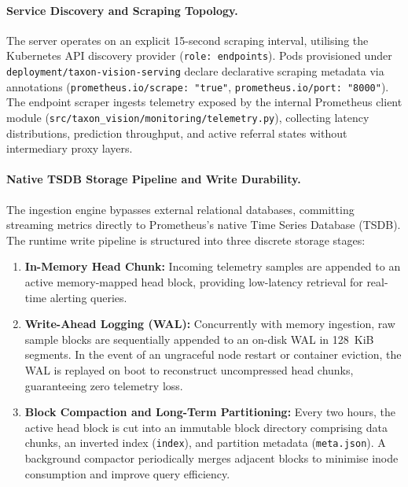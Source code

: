 \paragraph{Service Discovery and Scraping Topology.}
The server operates on an explicit 15-second scraping interval, utilising the Kubernetes API discovery provider (\texttt{role: endpoints}). Pods provisioned under \texttt{deployment/taxon-vision-serving} declare declarative scraping metadata via annotations (\texttt{prometheus.io/scrape: "true"}, \texttt{prometheus.io/port: "8000"}). The endpoint scraper ingests telemetry exposed by the internal Prometheus client module (\nolinkurl{src/taxon_vision/monitoring/telemetry.py}), collecting latency distributions, prediction throughput, and active referral states without intermediary proxy layers.

\paragraph{Native TSDB Storage Pipeline and Write Durability.}
The ingestion engine bypasses external relational databases, committing streaming metrics directly to Prometheus's native Time Series Database (TSDB). The runtime write pipeline is structured into three discrete storage stages:
\begin{enumerate}
    \item \textbf{In-Memory Head Chunk:} Incoming telemetry samples are appended to an active memory-mapped head block, providing low-latency retrieval for real-time alerting queries.
    \item \textbf{Write-Ahead Logging (WAL):} Concurrently with memory ingestion, raw sample blocks are sequentially appended to an on-disk WAL in 128~KiB segments. In the event of an ungraceful node restart or container eviction, the WAL is replayed on boot to reconstruct uncompressed head chunks, guaranteeing zero telemetry loss.
    \item \textbf{Block Compaction and Long-Term Partitioning:} Every two hours, the active head block is cut into an immutable block directory comprising data chunks, an inverted index (\texttt{index}), and partition metadata (\nolinkurl{meta.json}). A background compactor periodically merges adjacent blocks to minimise inode consumption and improve query efficiency.
\end{enumerate}

